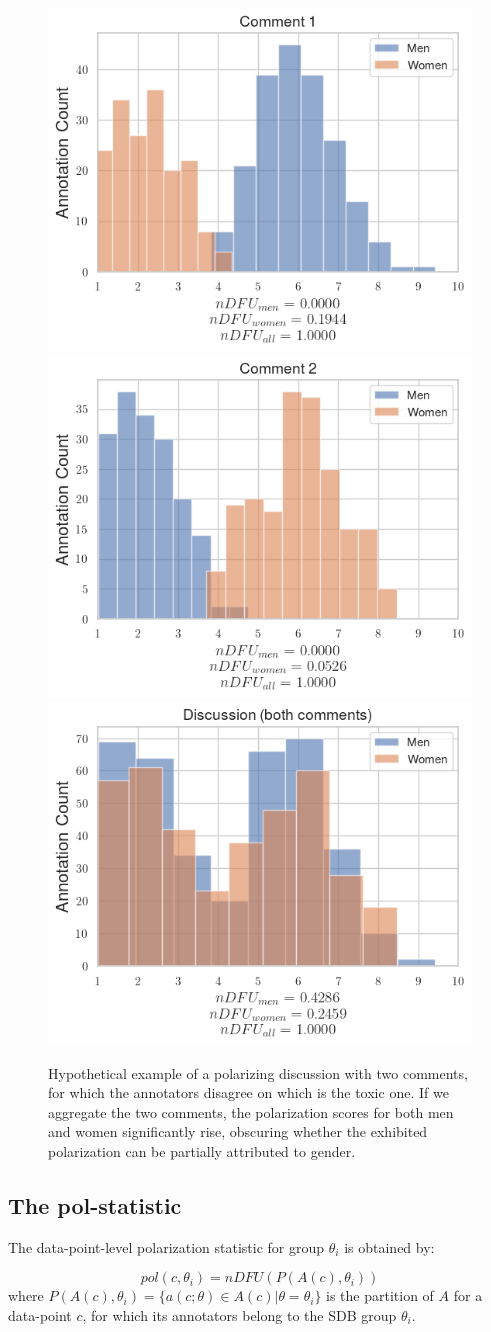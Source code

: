 \documentclass{article}
\begin{document}
\begin{figure}
	\centering
    \includegraphics[width=0.3\linewidth]{ndfu_comment1.png}
    \includegraphics[width=0.3 \linewidth]{ndfu_comment2.png}
	\includegraphics[width=0.3 \linewidth]{ndfu_discussion.png}
	\caption{Hypothetical example of a polarizing discussion with two comments, for which the annotators disagree on which is the toxic one. If we aggregate the two comments, the polarization scores for both men and women significantly rise, obscuring whether the exhibited polarization can be partially attributed to gender. %
    }
	\label{fig:ndfu_multi_data-point}
\end{figure}

 
 
 \subsection{The pol-statistic}
 \label{ssec:methodology:polstat}
  
 The data-point-level polarization statistic for group $\theta_i$ is obtained by:
 
 \begin{equation}
 	pol(c, \theta_i) = nDFU(P(A(c), \theta_i))
 \end{equation}
 \noindent where $P(A(c), \theta_i) = \{a(c; \theta) \in A(c) | \theta=\theta_i\}$ is the partition of $A$ for a data-point $c$, for which its annotators belong to the \ac{SDB} group $\theta_i$.
 
\end{document}
